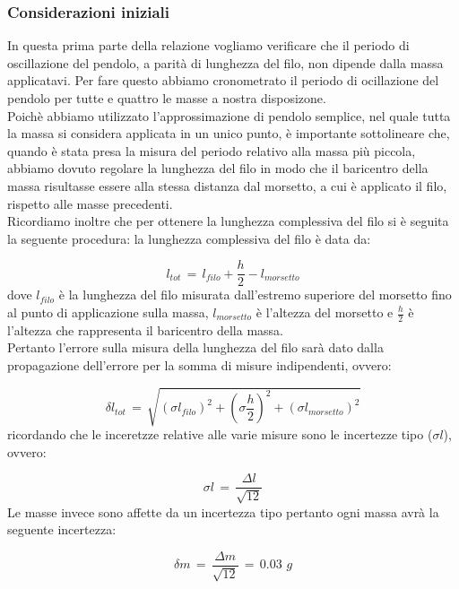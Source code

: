\subsubsection{Considerazioni iniziali}
In questa prima parte della relazione vogliamo verificare che il periodo di oscillazione del pendolo, a parità di lunghezza del filo, non dipende dalla massa applicatavi.
Per fare questo abbiamo cronometrato il periodo di ocillazione del pendolo per tutte e quattro le masse a nostra disposizone.\\
Poichè abbiamo utilizzato l'approssimazione di pendolo semplice, nel quale tutta la massa si considera applicata in un unico punto, è importante sottolineare che, quando è stata presa la misura del periodo relativo alla massa più piccola, abbiamo dovuto regolare la lunghezza del filo in modo che il baricentro della massa risultasse essere alla stessa distanza dal morsetto, a cui è applicato il filo, rispetto alle masse precedenti.\\
Ricordiamo inoltre che per ottenere la lunghezza complessiva del filo si è seguita la seguente procedura: la lunghezza complessiva del filo è data da:

\begin{equation}
	l_{tot} \,=\, l_{filo} + \frac{h}{2} - l_{morsetto}
\end{equation}
%
dove $l _{filo}$ è la lunghezza del filo misurata dall'estremo superiore del morsetto fino al punto di applicazione sulla massa, $l_{morsetto}$ è l'altezza del morsetto e $\frac{h}{2}$ è l'altezza che rappresenta il baricentro della massa.\\
Pertanto l'errore sulla misura della lunghezza del filo sarà dato dalla propagazione dell'errore per la somma di misure indipendenti, ovvero:

\begin{equation*}
	\delta l_{tot} \,=\, \sqrt{(\sigma l_{filo})^2 + (\sigma \frac{h}{2})^2 + (\sigma l_{morsetto})^2}
\end{equation*}
%
ricordando che le inceretzze relative alle varie misure sono le incertezze tipo ($\sigma l$), ovvero:

\begin{equation*}
	\sigma l \,=\, \frac{\Delta l}{\sqrt{12}}
\end{equation*}
%
Le masse invece sono affette da un incertezza tipo pertanto ogni massa avrà la seguente incertezza:

\begin{equation*}
	\delta m \,=\, \frac{\Delta m}{\sqrt{12}} \,=\, 0.03 \,\, g
\end{equation*}

